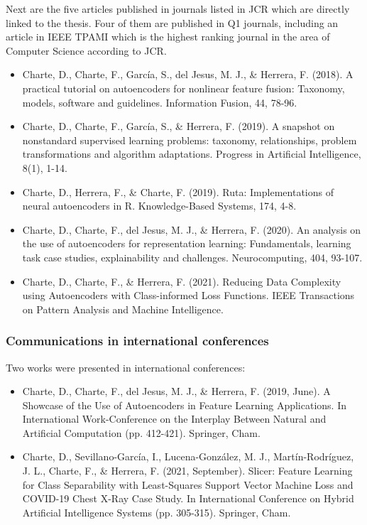 Next are the five articles published in journals listed in JCR which are directly linked to the thesis. Four of them are published in Q1 journals, including an article in IEEE TPAMI which is the highest ranking journal in the area of Computer Science according to JCR.

\begin{itemize}
    \item Charte, D., Charte, F., García, S., del Jesus, M. J., \& Herrera, F. (2018). A practical tutorial on autoencoders for nonlinear feature fusion: Taxonomy, models, software and guidelines. Information Fusion, 44, 78-96.
    \item Charte, D., Charte, F., García, S., \& Herrera, F. (2019). A snapshot on nonstandard supervised learning problems: taxonomy, relationships, problem transformations and algorithm adaptations. Progress in Artificial Intelligence, 8(1), 1-14.
    \item Charte, D., Herrera, F., \& Charte, F. (2019). Ruta: Implementations of neural autoencoders in R. Knowledge-Based Systems, 174, 4-8.
    \item Charte, D., Charte, F., del Jesus, M. J., \& Herrera, F. (2020). An analysis on the use of autoencoders for representation learning: Fundamentals, learning task case studies, explainability and challenges. Neurocomputing, 404, 93-107.
    \item Charte, D., Charte, F., \& Herrera, F. (2021). Reducing Data Complexity using Autoencoders with Class-informed Loss Functions. IEEE Transactions on Pattern Analysis and Machine Intelligence.
\end{itemize}

\subsubsection{Communications in international conferences}

Two works were presented in international conferences:

\begin{itemize}
    \item Charte, D., Charte, F., del Jesus, M. J., \& Herrera, F. (2019, June). A Showcase of the Use of Autoencoders in Feature Learning Applications. In International Work-Conference on the Interplay Between Natural and Artificial Computation (pp. 412-421). Springer, Cham.
    \item Charte, D., Sevillano-García, I., Lucena-González, M. J., Martín-Rodríguez, J. L., Charte, F., \& Herrera, F. (2021, September). Slicer: Feature Learning for Class Separability with Least-Squares Support Vector Machine Loss and COVID-19 Chest X-Ray Case Study. In International Conference on Hybrid Artificial Intelligence Systems (pp. 305-315). Springer, Cham.
\end{itemize}



